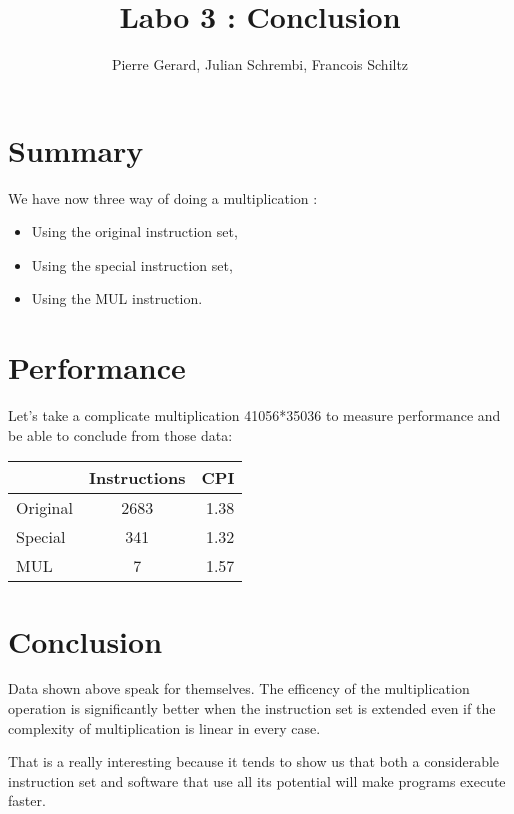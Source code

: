 \documentclass[a4paper]{article}
\title{Labo 3 : Conclusion}
\author{Pierre Gerard, Julian Schrembi, Francois Schiltz}
\begin{document}
\maketitle

\section{Summary}

We have now three way of doing a multiplication :
\begin{itemize}
	\item Using the original instruction set,
	\item Using the special instruction set,
	\item Using the MUL instruction.
\end{itemize}

\section{Performance}

Let's take a complicate multiplication 41056*35036 to measure performance and be able to conclude from those data:

\begin{center}
  \begin{tabular}{ | l | c | r |}
    \hline
     & Instructions & CPI \\ \hline
    Original & 2683 & 1.38 \\ \hline
    Special & 341 & 1.32 \\ \hline
    MUL & 7 & 1.57 \\
    \hline
  \end{tabular}
\end{center}

\section{Conclusion}
Data shown above speak for themselves. The efficency of the multiplication operation is significantly better when the instruction set is extended even if the complexity of multiplication is linear in every case.

That is a really interesting because it tends to show us that both a considerable instruction set and software that use all its potential will make programs execute faster.
\end{document}
